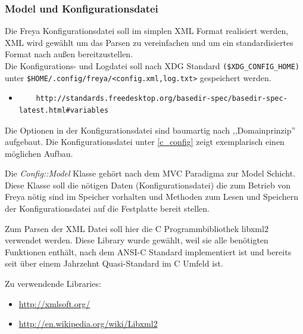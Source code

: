 \subsubsection{Model und Konfigurationsdatei}

Die Freya Konfigurationsdatei soll im simplen XML Format realisiert werden, XML wird gewählt um das Parsen zu vereinfachen und um
ein standardisiertes Format nach außen bereitzustellen. 
\\
Die Konfigurations- und Logdatei soll nach XDG Standard \verb+($XDG_CONFIG_HOME)+ unter \verb+$HOME/.config/freya/<config.xml,log.txt>+ gespeichert werden.
\begin{itemize}
\item \begin{verbatim}
	http://standards.freedesktop.org/basedir-spec/basedir-spec-latest.html#variables
\end{verbatim}
\end{itemize}

Die Optionen in der Konfigurationsdatei sind baumartig nach ,,Domainprinzip'' aufgebaut. Die Konfigurationsdatei unter \ref{c_config}
zeigt exemplarisch einen möglichen Aufbau.


	



Die \emph{Config::Model} Klasse gehört nach dem MVC Paradigma zur Model Schicht. Diese Klasse soll die nötigen Daten (Konfigurationsdatei)
die zum Betrieb von Freya nötig sind im Speicher vorhalten und Methoden zum Lesen und Speichern der Konfigurationsdatei auf die Festplatte 
bereit stellen.

Zum Parsen der XML Datei soll hier die C Programmbibliothek libxml2 verwendet werden. Diese Library wurde gewählt, weil sie alle benötigten Funktionen enthält, nach dem ANSI-C Standard implementiert ist
und bereits seit über einem Jahrzehnt Quasi-Standard im C Umfeld ist.

Zu verwendende Libraries:
\begin{itemize}
    \item \url{http://xmlsoft.org/}
    \item \url{http://en.wikipedia.org/wiki/Libxml2}
\end{itemize}




